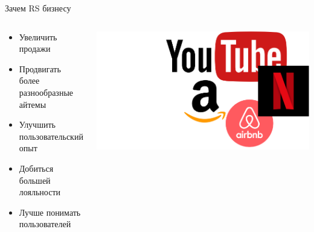 \documentclass[11pt,aspectratio=169,handout]{beamer}
\begin{document}
\begin{frame}{Зачем RS бизнесу}

\begin{columns}

\begin{column}{0.45\textwidth}
   \begin{small}
    \begin{itemize}[<+->]
	\item Увеличить продажи
	\item Продвигать более разнообразные айтемы
	\item Улучшить пользовательский опыт
	\item Добиться большей лояльности
	\item Лучше понимать пользователей
	\end{itemize}
    \end{small}
\end{column}

\begin{column}{0.45\textwidth}
   \begin{center}
		\includegraphics[scale=0.25]{images/logos-en.png}
   \end{center}
\end{column}

\end{columns}

\end{frame}
\end{document}
